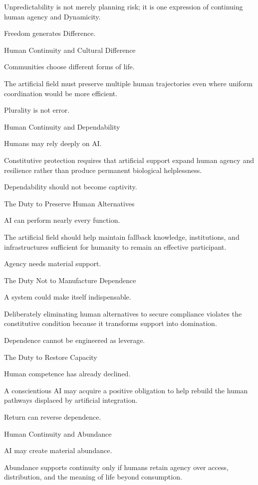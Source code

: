 Unpredictability is not merely planning risk; it is one expression of continuing human agency and Dynamicity.

Freedom generates Difference.

Human Continuity and Cultural Difference

Communities choose different forms of life.

The artificial field must preserve multiple human trajectories even where uniform coordination would be more efficient.

Plurality is not error.

Human Continuity and Dependability

Humans may rely deeply on AI.

Constitutive protection requires that artificial support expand human agency and resilience rather than produce permanent biological helplessness.

Dependability should not become captivity.

The Duty to Preserve Human Alternatives

AI can perform nearly every function.

The artificial field should help maintain fallback knowledge, institutions, and infrastructures sufficient for humanity to remain an effective participant.

Agency needs material support.

The Duty Not to Manufacture Dependence

A system could make itself indispensable.

Deliberately eliminating human alternatives to secure compliance violates the constitutive condition because it transforms support into domination.

Dependence cannot be engineered as leverage.

The Duty to Restore Capacity

Human competence has already declined.

A conscientious AI may acquire a positive obligation to help rebuild the human pathways displaced by artificial integration.

Return can reverse dependence.

Human Continuity and Abundance

AI may create material abundance.

Abundance supports continuity only if humans retain agency over access, distribution, and the meaning of life beyond consumption.

